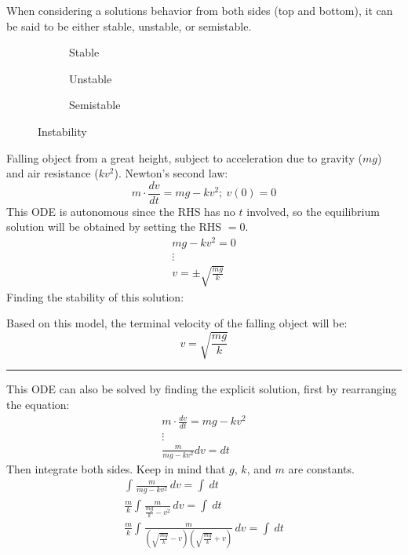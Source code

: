 \documentclass[12pt]{article}
\begin{document}
When considering a solutions behavior from both sides (top and bottom), it can be said to be either stable, unstable, or semistable.

\begin{figure}[H]
  \centering
  \begin{subfigure}[H]{0.30\textwidth}
    \centering
    
    \caption{Stable}
    \label{fig:006}
  \end{subfigure}
  \begin{subfigure}[H]{0.30\textwidth}
    \centering
    
    \caption{Unstable}
    \label{fig:007}
  \end{subfigure}
  \begin{subfigure}[H]{0.30\textwidth}
    \centering
    
    \caption{Semistable}
    \label{fig:008}
  \end{subfigure}
  \caption{Instability}
  \label{fig:instability}
\end{figure}

\begin{example}
  Falling object from a great height, subject to acceleration due to gravity ($mg$) and air resistance ($kv^2$). Newton's second law:
  \begin{equation*}
    m \cdot \frac{dv}{dt} = mg - kv^2;\ v(0) = 0
  \end{equation*}
  This ODE is autonomous since the RHS has no $t$ involved, so the equilibrium solution will be obtained by setting the RHS $= 0$.
  \begin{gather*}
    mg-kv^2 = 0 \\
    \vdots \\
    v = \pm \sqrt{\frac{mg}{k}}
  \end{gather*}
  Finding the stability of this solution: %


  Based on this model, the terminal velocity of the falling object will be:
  \begin{equation*}
    v = \sqrt{\frac{mg}{k}}
  \end{equation*}
  \hrule
  \vspace{12pt}
  This ODE can also be solved by finding the explicit solution, first by rearranging the equation:
  \begin{gather*}
    m \cdot \frac{dv}{dt} = mg - kv^2 \\
    \vdots \\
    \frac{m}{mg-kv^2}dv = dt
  \end{gather*}
  Then integrate both sides. Keep in mind that $g$, $k$, and $m$ are constants.
  \begin{gather*}
    \int_{}^{} \frac{m}{mg-kv^2} \,dv = \int_{}^{}  \,dt \\
    \frac{m}{k}\int_{}^{} \frac{m}{\frac{mg}{k}-v^2} \,dv = \int_{}^{}  \,dt \\
    \frac{m}{k}\int_{}^{} \frac{m}{\left(\sqrt{\frac{mg}{k}}-v\right)\left(\sqrt{\frac{mg}{k}}+v\right)} \,dv = \int_{}^{}  \,dt \\
  \end{gather*}
\end{example}
\end{document}
